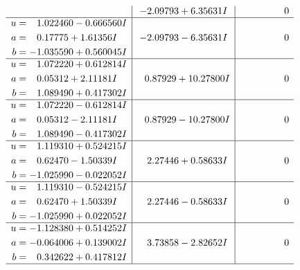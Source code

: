 \documentclass[1p]{elsarticle_modified}
\theoremstyle{definition}
\begin{document}
$$\begin{array}{c|c|c}
 & -2.09793 + 6.35631 I & \phantom{-0.000000 } 0 \\ \hline\begin{aligned}
u &= \phantom{-}1.022460 - 0.666560 I \\
a &= \phantom{-}0.17775 + 1.61356 I \\
b &= -1.035590 + 0.560045 I\end{aligned}
 & -2.09793 - 6.35631 I & \phantom{-0.000000 } 0 \\ \hline\begin{aligned}
u &= \phantom{-}1.072220 + 0.612814 I \\
a &= \phantom{-}0.05312 + 2.11181 I \\
b &= \phantom{-}1.089490 + 0.417302 I\end{aligned}
 & \phantom{-}0.87929 + 10.27800 I & \phantom{-0.000000 } 0 \\ \hline\begin{aligned}
u &= \phantom{-}1.072220 - 0.612814 I \\
a &= \phantom{-}0.05312 - 2.11181 I \\
b &= \phantom{-}1.089490 - 0.417302 I\end{aligned}
 & \phantom{-}0.87929 - 10.27800 I & \phantom{-0.000000 } 0 \\ \hline\begin{aligned}
u &= \phantom{-}1.119310 + 0.524215 I \\
a &= \phantom{-}0.62470 - 1.50339 I \\
b &= -1.025990 - 0.022052 I\end{aligned}
 & \phantom{-}2.27446 + 0.58633 I & \phantom{-0.000000 } 0 \\ \hline\begin{aligned}
u &= \phantom{-}1.119310 - 0.524215 I \\
a &= \phantom{-}0.62470 + 1.50339 I \\
b &= -1.025990 + 0.022052 I\end{aligned}
 & \phantom{-}2.27446 - 0.58633 I & \phantom{-0.000000 } 0 \\ \hline\begin{aligned}
u &= -1.128380 + 0.514252 I \\
a &= -0.064006 + 0.139002 I \\
b &= \phantom{-}0.342622 + 0.417812 I\end{aligned}
 & \phantom{-}3.73858 - 2.82652 I & \phantom{-0.000000 } 0\\
 \hline 
 \end{array}$$\newpage$$\begin{array}{c|c|c}  

\end{array}$$
\end{document}
